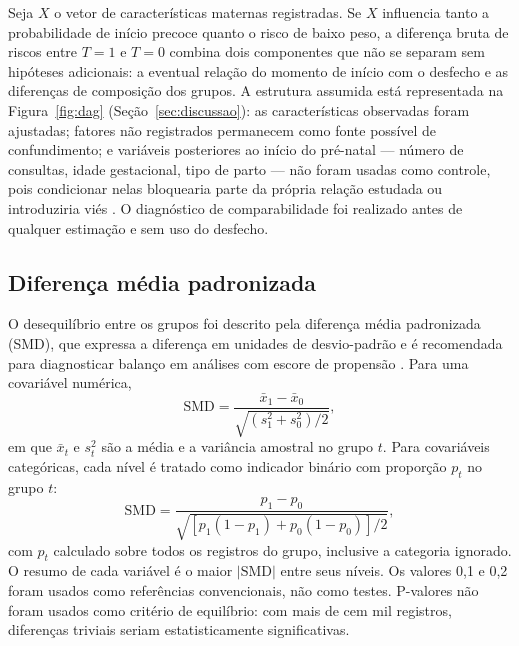 \documentclass[11pt,a4paper]{article}
\begin{document}
Seja $X$ o vetor de características maternas registradas. Se $X$ influencia tanto a
probabilidade de início precoce quanto o risco de baixo peso, a diferença bruta de riscos
entre $T=1$ e $T=0$ combina dois componentes que não se separam sem hipóteses adicionais:
a eventual relação do momento de início com o desfecho e as diferenças de composição dos
grupos. A estrutura assumida está representada na Figura~\ref{fig:dag}
(Seção~\ref{sec:discussao}): as características observadas foram ajustadas; fatores não
registrados permanecem como fonte possível de confundimento; e variáveis posteriores ao
início do pré-natal --- número de consultas, idade gestacional, tipo de parto --- não
foram usadas como controle, pois condicionar nelas bloquearia parte da própria relação
estudada ou introduziria viés \cite{schisterman2009,wilcox2011}. O diagnóstico de
comparabilidade foi realizado antes de qualquer estimação e sem uso do desfecho.

\subsection{Diferença média padronizada}

O desequilíbrio entre os grupos foi descrito pela diferença média padronizada (SMD), que
expressa a diferença em unidades de desvio-padrão e é recomendada para diagnosticar
balanço em análises com escore de propensão \cite{austin2015}. Para uma covariável
numérica,
\begin{equation}\label{eq:smd-num}
\mathrm{SMD} = \frac{\bar{x}_1 - \bar{x}_0}{\sqrt{\left(s_1^2 + s_0^2\right)/2}},
\end{equation}
em que $\bar{x}_t$ e $s_t^2$ são a média e a variância amostral no grupo $t$. Para
covariáveis categóricas, cada nível é tratado como indicador binário com proporção $p_t$
no grupo $t$:
\begin{equation}\label{eq:smd-cat}
\mathrm{SMD} = \frac{p_1 - p_0}{\sqrt{\left[p_1(1-p_1) + p_0(1-p_0)\right]/2}},
\end{equation}
com $p_t$ calculado sobre todos os registros do grupo, inclusive a categoria ignorado. O
resumo de cada variável é o maior $|\mathrm{SMD}|$ entre seus níveis. Os valores 0,1 e
0,2 foram usados como referências convencionais, não como testes. P-valores não foram
usados como critério de equilíbrio: com mais de cem mil registros, diferenças triviais
seriam estatisticamente significativas.
\end{document}
